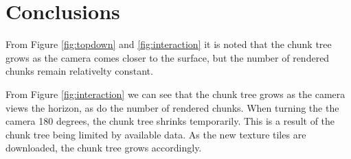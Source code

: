 \chapter{Conclusions}
From Figure \ref{fig:topdown} and \ref{fig:interaction} it is noted that the chunk tree grows as the camera comes closer to the surface, but the number of rendered chunks remain relativelty constant.

From Figure \ref{fig:interaction} we can see that the chunk tree grows as the camera views the horizon, as do the number of rendered chunks. When turning the the camera 180 degrees, the chunk tree shrinks temporarily. This is a result of the chunk tree being limited by available data. As the new texture tiles are downloaded, the chunk tree grows accordingly.